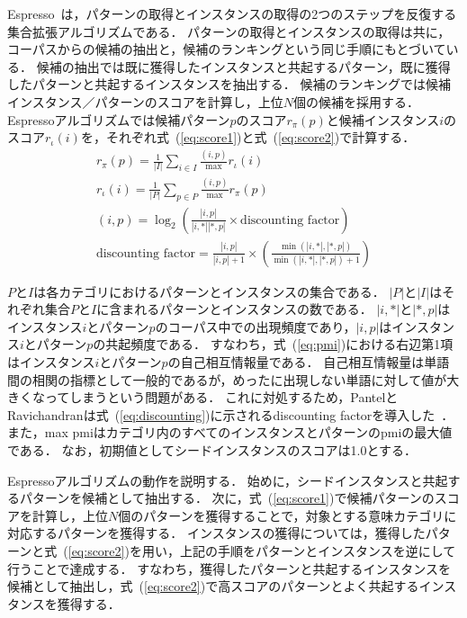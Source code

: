 \documentclass[japanese]{jnlp_1.4}
\newcommand{\pmi}{}
\begin{document}
Espresso~\cite{pantel-pennacchiotti:2006:COLACL}は，パターンの取得とインスタンスの取得の2つのステップを反復する集合拡張アルゴリズムである．
パターンの取得とインスタンスの取得は共に，コーパスからの候補の抽出と，候補のランキングという同じ手順にもとづいている．
候補の抽出では既に獲得したインスタンスと共起するパターン，既に獲得したパターンと共起するインスタンスを抽出する．
候補のランキングでは候補インスタンス／パターンのスコアを計算し，上位$N$個の候補を採用する．
Espressoアルゴリズムでは候補パターン$p$のスコア$r_\pi(p)$と候補インスタンス$i$のスコア$r_\iota(i)$を，それぞれ式~(\ref{eq:score1})と式~(\ref{eq:score2})で計算する．
\begin{gather}
r_\pi(p) = \frac{1}{|I|} \sum_{i \in I}\frac{\pmi (i,p)}{\max \pmi}r_\iota(i)
	\label{eq:score1} \\
r_\iota(i) = \frac{1}{|P|} \sum_{p \in P}\frac{\pmi (i,p)} \max \pmi r_\pi(p)
	\label{eq:score2} \\
\pmi (i,p) = \log_2 \left(\frac{|i,p|}{|i,*||*,p|} \times \text{discounting factor}\right)
	\label{eq:pmi} \\
\text{discounting factor} = \frac{|i,p|}{|i,p| + 1} \times \left(\frac{\min \left(|i,*|,|*,p|\right)}{\min \left(|i,*|,|*,p|\right) + 1}\right) 
	\label{eq:discounting}
\end{gather}

$P$と$I$は各カテゴリにおけるパターンとインスタンスの集合である．
$|P|$と$|I|$はそれぞれ集合$P$と$I$に含まれるパターンとインスタンスの数である．
$|i, *|$と$|*, p|$はインスタンス$i$とパターン$p$のコーパス中での出現頻度であり，$|i, p|$はインスタンス$i$とパターン$p$の共起頻度である．
すなわち，式~(\ref{eq:pmi})における右辺第1項はインスタンス$i$とパターン$p$の自己相互情報量である．
自己相互情報量は単語間の相関の指標として一般的であるが，めったに出現しない単語に対して値が大きくなってしまうという問題がある．
これに対処するため，PantelとRavichandranは式~(\ref{eq:discounting})に示されるdiscounting factorを導入した~\cite{pantel04}．
また，max pmiはカテゴリ内のすべてのインスタンスとパターンのpmiの最大値である．
なお，初期値としてシードインスタンスのスコアは1.0とする．

Espressoアルゴリズムの動作を説明する．
始めに，シードインスタンスと共起するパターンを候補として抽出する．
次に，式~(\ref{eq:score1})で候補パターンのスコアを計算し，上位$N$個のパターンを獲得することで，対象とする意味カテゴリに対応するパターンを獲得する．
インスタンスの獲得については，獲得したパターンと式~(\ref{eq:score2})を用い，上記の手順をパターンとインスタンスを逆にして行うことで達成する．
すなわち，獲得したパターンと共起するインスタンスを候補として抽出し，式~(\ref{eq:score2})で高スコアのパターンとよく共起するインスタンスを獲得する．
\end{document}
